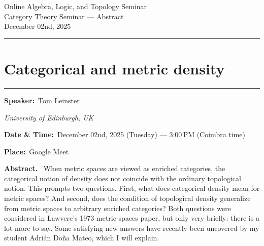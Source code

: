 \documentclass[11pt,a4paper]{article}
\newcommand{\Title}[1]{\section*{#1}\vspace{-0.25em}\hrule\vspace{0.8em}}
\newcommand{\Field}[2]{\textbf{#1:}~#2\par}
\newcommand{\Affil}[1]{\textit{#1}\par}
\newcommand{\Abstract}{\vspace{0.6em}\textbf{Abstract.}~}
\begin{document}
	
	\begin{center}
		{\LARGE Online Algebra, Logic, and Topology Seminar}\\[0.25em]
		{\large Category Theory Seminar — Abstract}\\[0.5em]
		December 02nd, 2025
	\end{center}
	
	\vspace{1.25em}\hrule\vspace{1.25em}
	
	\Title{Categorical and metric density}
	
	\Field{Speaker}{Tom Leinster}
	\Affil{University of Edinburgh, UK}
	
	\Field{Date \& Time}{December 02nd, 2025 (Tuesday) — 3{:}00\,PM (Coimbra time)}
	\Field{Place}{Google Meet}
	
	\Abstract
When metric spaces are viewed as enriched categories, the categorical
notion of density does not coincide with the ordinary topological notion.
This prompts two questions. First, what does categorical density mean for
metric spaces? And second, does the condition of topological density
generalize from metric spaces to arbitrary enriched categories? Both
questions were considered in Lawvere's 1973 metric spaces paper, but only
very briefly: there is a lot more to say. Some satisfying new answers have
recently been uncovered by my student Adrián Doña Mateo, which I will
explain.	
\end{document}

